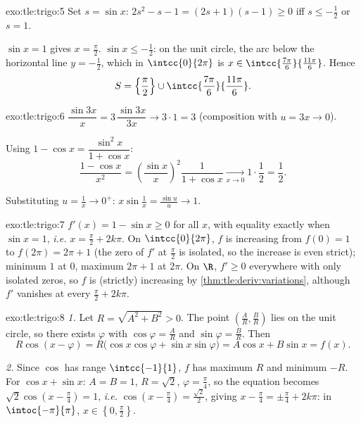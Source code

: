 \begin{solution}{exo:tle:trigo:5}
Set $s = \sin x$: $2s^2 - s - 1 = (2s + 1)(s - 1) \geq 0$ iff
$s \leq -\frac12$ or $s = 1$.

$\sin x = 1$ gives $x = \frac\pi2$. $\sin x \leq -\frac12$: on the unit
circle, the arc below the horizontal line $y = -\frac12$, which in
$\intcc{0}{2\pi}$ is $x \in \intcc{\frac{7\pi}{6}}{\frac{11\pi}{6}}$.
Hence
\[
S = \left\{\frac{\pi}{2}\right\} \cup
\intcc{\frac{7\pi}{6}}{\frac{11\pi}{6}} .
\]
\end{solution}

\begin{solution}{exo:tle:trigo:6}
$\dfrac{\sin 3x}{x} = 3\,\dfrac{\sin 3x}{3x} \to 3 \cdot 1 = 3$
(composition with $u = 3x \to 0$).

Using $1 - \cos x = \dfrac{\sin^2 x}{1 + \cos x}$:
\[
\frac{1 - \cos x}{x^2}
= \left(\frac{\sin x}{x}\right)^{\!2} \frac{1}{1 + \cos x}
\xrightarrow[x\to0]{} 1 \cdot \frac12 = \frac12 .
\]

Substituting $u = \frac1x \to 0^+$:
$x \sin\frac1x = \frac{\sin u}{u} \to 1$.
\end{solution}

\begin{solution}{exo:tle:trigo:7}
$f'(x) = 1 - \sin x \geq 0$ for all $x$, with equality exactly when
$\sin x = 1$, \emph{i.e.} $x = \frac\pi2 + 2k\pi$. On $\intcc{0}{2\pi}$, $f$
is increasing from $f(0) = 1$ to $f(2\pi) = 2\pi + 1$ (the zero of $f'$ at
$\frac{\pi}{2}$ is isolated, so the increase is even strict); minimum $1$ at
$0$, maximum $2\pi + 1$ at $2\pi$. On $\R$, $f' \geq 0$ everywhere with only
isolated zeros, so $f$ is (strictly) increasing by
\cref{thm:tle:deriv:variations}, although $f'$ vanishes at every
$\frac\pi2 + 2k\pi$.
\end{solution}

\begin{solution}{exo:tle:trigo:8}
\emph{1.} Let $R = \sqrt{A^2 + B^2} > 0$. The point
$\left(\frac AR, \frac BR\right)$ lies on the unit circle, so there exists
$\varphi$ with $\cos\varphi = \frac AR$ and $\sin\varphi = \frac BR$. Then
\[
R\cos(x - \varphi) = R\bigl(\cos x\cos\varphi + \sin x \sin\varphi\bigr)
= A\cos x + B\sin x = f(x).
\]

\emph{2.} Since $\cos$ has range $\intcc{-1}{1}$, $f$ has maximum $R$ and
minimum $-R$. For $\cos x + \sin x$: $A = B = 1$, $R = \sqrt2$,
$\varphi = \frac\pi4$, so the equation becomes
$\sqrt2\cos\left(x - \frac\pi4\right) = 1$, \emph{i.e.}
$\cos\left(x - \frac\pi4\right) = \frac{\sqrt2}{2}$, giving
$x - \frac\pi4 = \pm\frac\pi4 + 2k\pi$: in $\intoc{-\pi}{\pi}$,
$x \in \left\{0, \frac\pi2\right\}$.
\end{solution}

